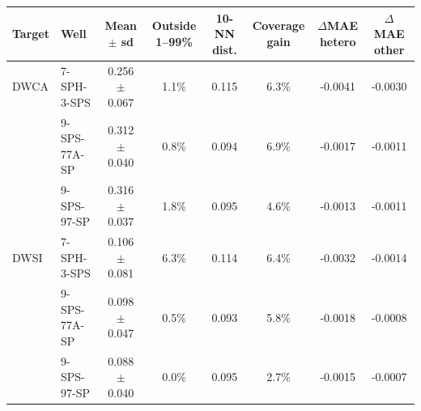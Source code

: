 \begin{tabular}{llcccccc}
\hline
\textbf{Target} & \textbf{Well} & \textbf{Mean $\pm$ sd} & \textbf{Outside 1--99\%} & \textbf{10-NN dist.} & \textbf{Coverage gain} & \textbf{$\Delta$MAE hetero} & \textbf{$\Delta$MAE other} \\ \hline
DWCA & 7-SPH-3-SPS & 0.256 $\pm$ 0.067 & 1.1\% & 0.115 & 6.3\% & -0.0041 & -0.0030 \\
 & 9-SPS-77A-SP & 0.312 $\pm$ 0.040 & 0.8\% & 0.094 & 6.9\% & -0.0017 & -0.0011 \\
 & 9-SPS-97-SP & 0.316 $\pm$ 0.037 & 1.8\% & 0.095 & 4.6\% & -0.0013 & -0.0011 \\
\hline
DWSI & 7-SPH-3-SPS & 0.106 $\pm$ 0.081 & 6.3\% & 0.114 & 6.4\% & -0.0032 & -0.0014 \\
 & 9-SPS-77A-SP & 0.098 $\pm$ 0.047 & 0.5\% & 0.093 & 5.8\% & -0.0018 & -0.0008 \\
 & 9-SPS-97-SP & 0.088 $\pm$ 0.040 & 0.0\% & 0.095 & 2.7\% & -0.0015 & -0.0007 \\
\hline
\end{tabular}
